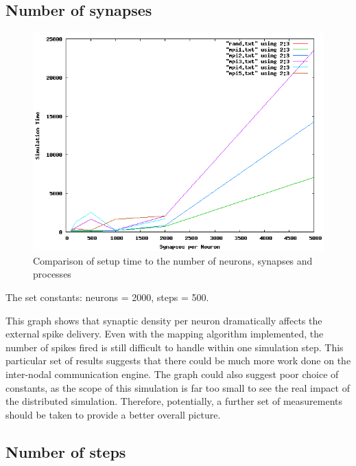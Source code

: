 \subsection{Number of synapses}

\begin{figure}[h!]
\begin{center}
\includegraphics[scale = 0.4]{images/distributed_synapses.png}
\end{center}
\caption{Comparison of setup time to the number of neurons, synapses and processes}
\end{figure}

The set constants: neurons = 2000, steps = 500.

This graph shows that synaptic density per neuron dramatically affects the external spike delivery. Even with the mapping algorithm implemented, the number of spikes fired is still difficult to handle within one simulation step. This particular set of results suggests that there could be much more work done on the inter-nodal communication engine. The graph could also suggest poor choice of constants, as the scope of this simulation is far too small to see the real impact of the distributed simulation. Therefore, potentially, a further set of measurements should be taken to provide a better overall picture.

\subsection{Number of steps}

